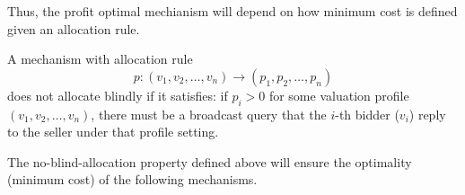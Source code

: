
Thus, the profit optimal mechianism will depend on how minimum cost is defined given an allocation rule. 


\begin{definition}\label{def:allocation_cost}
A mechanism with allocation rule $$p: (v_1, v_2, \ldots, v_n) \rightarrow
(p_1, p_2, \ldots, p_n)$$ does not allocate blindly if it satisfies: if $p_i >
0$ for some valuation profile $(v_1, v_2, \ldots, v_n)$, there must be a
broadcast query that the $i$-th bidder ($v_i$) reply to the seller
under that profile setting.
\end{definition}

The no-blind-allocation property defined above will ensure the optimality
(minimum cost) of the following mechanisms.

